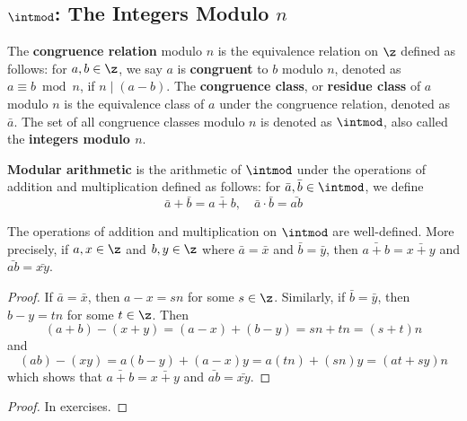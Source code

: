 \newpage

\subsection{\texorpdfstring{$\intmod$: The Integers Modulo $n$}{Z/nZ: The Integers Modulo n}} \label{sec0.3}

 The \textbf{congruence relation} modulo $n$ is the equivalence relation on $\z$ defined as follows: for $a, b \in \z$, we say $a$ is \textbf{congruent} to $b$ modulo $n$, denoted as $a \equiv b \bmod n$, if $n \mid (a - b)$. The \textbf{congruence class}, or \textbf{residue class} of $a$ modulo $n$ is the equivalence class of $a$ under the congruence relation, denoted as $\bar a$. The set of all congruence classes modulo $n$ is denoted as $\intmod$, also called the \textbf{integers modulo $n$}.

 \textbf{Modular arithmetic} is the arithmetic of $\intmod$ under the operations of addition and multiplication defined as follows: for $\bar a, \bar b \in \intmod$, we define
\[\bar a + \bar b = \bar{a + b}, \quad \bar a \cdot \bar b = \bar{ab}\]

 \label{theo0.3}
The operations of addition and multiplication on $\intmod$ are well-defined. More precisely, if $a, x \in \z$ and $b, y \in \z$ where $\bar a = \bar x$ and $\bar b = \bar y$, then $\bar{a + b} = \bar{x + y}$ and $\bar{ab} = \bar{xy}$.
\begin{proof}
    If $\bar a = \bar x$, then $a - x = sn$ for some $s \in \z$. Similarly, if $\bar b = \bar y$, then $b - y = tn$ for some $t \in \z$. Then
    \[(a + b) - (x + y) = (a - x) + (b - y) = sn + tn = (s + t)n\]
    and
    \[(ab) - (xy) = a(b - y) + (a - x)y = a(tn) + (sn)y = (at + sy)n\]
    which shows that $\bar{a + b} = \bar{x + y}$ and $\bar{ab} = \bar{xy}$.
\end{proof}

\prop[$\units = \set{\bar a \in \intmod \mid (a, n) = 1}$] \label{prop0.4}
\begin{proof}
    In exercises.
\end{proof}